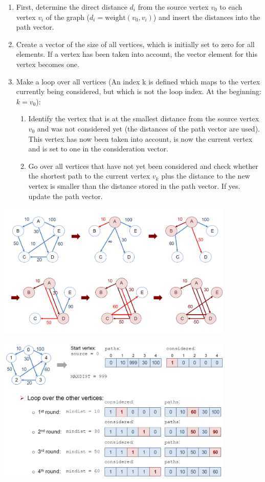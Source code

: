 \begin{enumerate}
    \item First, determine the direct distance $d_i$ from the source vertex $v_0$ to each vertex $v_i$ of the graph ($d_i=\mathrm{weight}(v_0,v_i)$) and insert the distances into the path vector.
    \item Create a vector of the size of all vertices, which is initially set to zero for all elements. If a vertex has been taken into account, the vector element for this vertex becomes one. 
    \item Make a loop over all vertices (An index k is defined which maps to the vertex currently being considered, but which is not the loop index. At the beginning: $k=v_0$):
    \begin{enumerate}
        \item Identify the vertex that is at the smallest distance from the source vertex $v_0$ and was not considered yet (the distances of the path vector are used). This vertex has now been taken into account, is now the current vertex and is set to one in the consideration vector.
        \item Go over all vertices that have not yet been considered and check whether the shortest path to the current vertex $v_k$ plus the distance to the new vertex is smaller than the distance stored in the path vector. If yes. update the path vector.
    \end{enumerate}
\end{enumerate}

\begin{center}\includegraphics[width=0.85\textwidth]{img/graphs/DijkstraGraph.png}\end{center}

\begin{center}\includegraphics[width=0.85\textwidth]{img/graphs/DijkstraVectorGraph.png}\end{center}

